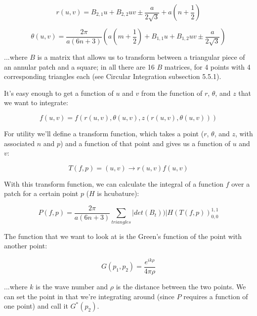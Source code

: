 \documentclass[etd,twoside,senior]{BYUPhys}
\begin{document}
\begin{equation}
  r\left(u,v\right)=B_{2,1}u+B_{2,2}uv\pm\frac{a}{2\sqrt{3}}+a\left(n+\frac{1}{2}\right)
\end{equation}

\begin{equation}
  \theta\left(u,v\right)=\frac{2\pi}{a(6n+3)}\left(a\left(m+\frac{1}{2}\right)+B_{1,1}u+B_{1,2}uv\pm\frac{a}{2\sqrt{3}}\right)
\end{equation}

...where $B$ is a matrix that allows us to transform between a triangular
piece of an annular patch and a square; in all there are 16 $B$ matrices,
for 4 points with 4 corresponding triangles each (see Circular Integration
subsection 5.5.1).

It's easy enough to get a function of $u$ and $v$ from the function
of $r$, $\theta$, and $z$ that we want to integrate:

\begin{equation}
  f\left(u,v\right)=f\left(r\left(u,v\right),\theta\left(u,v\right),z\left(r\left(u,v\right),\theta\left(u,v\right)\right)\right)
\end{equation}

For utility we'll define a transform function, which takes a point
($r$, $\theta$, and $z$, with associated $n$ and $p$) and a function
of that point and gives us a function of $u$ and $v$:

\begin{equation}
  T\left(f,p\right)=\left(u,v\right)\rightarrow r\left(u,v\right)f\left(u,v\right)
\end{equation}

With this transform function, we can calculate the integral of a function
$f$ over a patch for a certain point $p$ ($H$ is hcubature):

\begin{equation}
  P\left(f,p\right)=\frac{2\pi}{a\left(6n+3\right)}\sum_{triangles}|det\left(B_{t}\right))|H\left(T\left(f,p\right)\right)_{0,0}^{1,1}
\end{equation}

The function that we want to look at is the Green's function of the
point with another point:

\begin{equation} \label{eq:greens}
  G\left(p_{1},p_{2}\right)=\frac{e^{ik\rho}}{4\pi\rho}
\end{equation}

...where $k$ is the wave number and $\rho$ is the distance between
the two points. We can set the point in that we're integrating around
(since $P$ requires a function of one point) and call it $G^{*}\left(p_{2}\right)$.
\end{document}
